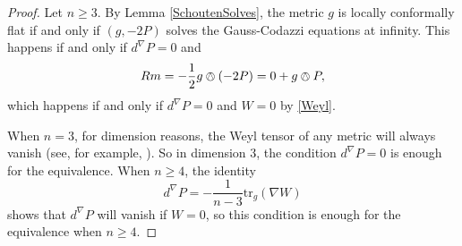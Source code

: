 \documentclass{amsart}
\newcommand{\tr}{\mathrm{tr}}
\begin{document}
\begin{proof}
Let $n \geq 3$. 
By Lemma \ref{SchoutenSolves}, the metric $g$ is locally conformally flat if and only if $(g,-2P)$ solves the Gauss-Codazzi equations at infinity.
This happens if and only if $d^{\nabla}P = 0$ and 
\[
Rm = -\frac{1}{2}g\owedge (-2P) = 0 + g \owedge P,
\]
which happens if and only if $d^\nabla P = 0$ and $W = 0$ by \eqref{Weyl}.

When $n = 3$, for dimension reasons, the Weyl tensor of any metric will always vanish (see, for example, \cite{Lee2018}).
So in dimension 3, the condition $d^\nabla P = 0$ is enough for the equivalence.
When $n \geq 4$, the identity
\[
d^\nabla P = -\frac{1}{n-3}\tr_g(\nabla W)
\]
shows that $d^\nabla P$ will vanish if $W=0$, so this condition is enough for the equivalence when $n\geq4$.
\end{proof}






 
\end{document}
